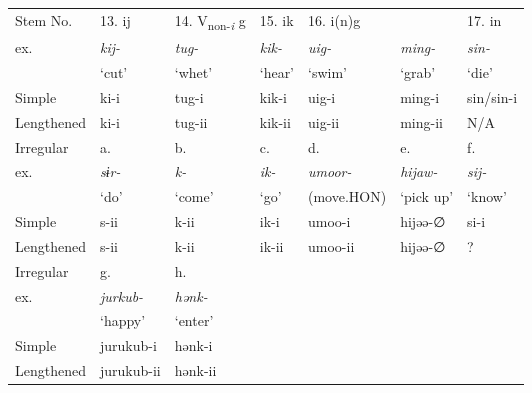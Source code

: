 {\begin{longtable}{ *{7}{l} }
Stem No.   & 13. ij        & 14. V\textsubscript{non-\textit{i}} g & 15. ik        & 16. i(n)g     &                & 17. in\\
ex.        & \textit{kij-} & \textit{tug-}                         & \textit{kik-} & \textit{uig-} & \textit{ming-} & \textit{sin-}\\
           & ‘cut’         & ‘whet’                                & ‘hear’        & ‘swim’        & ‘grab’         & ‘die’\\
Simple     & ki-i          & tug-i                                 & kik-i         & uig-i         & ming-i         & sin\slash sin-i\\
Lengthened & ki-i          & tug-ii                                & kik-ii        & uig-ii        & ming-ii        & N/A\\
\midrule

Irregular      & a.            & b.          & c.           & d.               & e.               & f.\\
ex.             & \textit{sɨr-} & \textit{k-} & \textit{ik-} & \textit{umoor-}  & \textit{hijaw-}  & \textit{sij-}\\
                & ‘do’          & ‘come’      & ‘go’         & (move.HON)       & ‘pick up’        & ‘know’\\
Simple          & s-ii          & k-ii        & ik-i         & umoo-i           & hijəə-∅          & si-i\\
Lengthened      & s-ii          & k-ii        & ik-ii        & umoo-ii          & hijəə-∅          & ?\\
\midrule

Irregular       &  g.               & h.\\
ex.             & \textit{jurkub-}  & \textit{hənk-}\\
                & ‘happy’           & ‘enter’\\
Simple          & jurukub-i         &  hənk-i\\      
Lengthened      & jurukub-ii        &  hənk-ii\\
\end{longtable}    }
